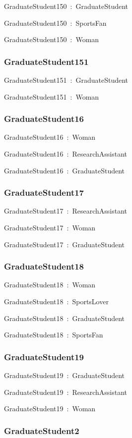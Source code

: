 \documentclass{article}
\begin{document}
GraduateStudent150~:~GraduateStudent

GraduateStudent150~:~SportsFan

GraduateStudent150~:~Woman

\subsubsection*{GraduateStudent151}

GraduateStudent151~:~GraduateStudent

GraduateStudent151~:~Woman

\subsubsection*{GraduateStudent16}

GraduateStudent16~:~Woman

GraduateStudent16~:~ResearchAssistant

GraduateStudent16~:~GraduateStudent

\subsubsection*{GraduateStudent17}

GraduateStudent17~:~ResearchAssistant

GraduateStudent17~:~Woman

GraduateStudent17~:~GraduateStudent

\subsubsection*{GraduateStudent18}

GraduateStudent18~:~Woman

GraduateStudent18~:~SportsLover

GraduateStudent18~:~GraduateStudent

GraduateStudent18~:~SportsFan

\subsubsection*{GraduateStudent19}

GraduateStudent19~:~GraduateStudent

GraduateStudent19~:~ResearchAssistant

GraduateStudent19~:~Woman

\subsubsection*{GraduateStudent2}
\end{document}
